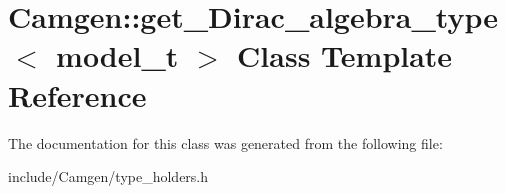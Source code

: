 \hypertarget{a00243}{\section{Camgen\-:\-:get\-\_\-\-Dirac\-\_\-algebra\-\_\-type$<$ model\-\_\-t $>$ Class Template Reference}
\label{a00243}
}


The documentation for this class was generated from the following file\-:\begin{DoxyCompactItemize}
\item 
include/\-Camgen/type\-\_\-holders.\-h\end{DoxyCompactItemize}
